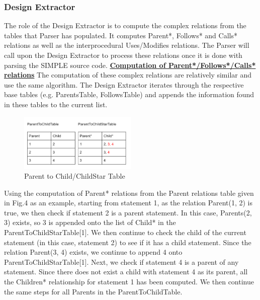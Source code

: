 \documentclass[12pt]{article}
\begin{document}
{{{{{{{{{{{{{{\begin{center}
\begin{minipage}{20em}
\end{minipage}
\end{center}
\normalsize



\subsubsection{Design Extractor}} 
The role of the Design Extractor is to compute the complex relations from the tables that Parser has populated. It computes Parent*, Follows* and Calls* relations as well as the interprocedural Uses/Modifies relations. The Parser will call upon the Design Extractor to process these relations once it is done with parsing the SIMPLE source code. \vspace{4mm}\newline
\textbf{\underline{Computation of Parent*/Follows*/Calls* relations}}\newline
The computation of these complex relations are relatively similar and use the same algorithm. The Design Extractor iterates through the respective base tables (e.g. ParentsTable, FollowsTable) and appends the information found in these tables to the current list.
\begin{figure}[htbp]
  \caption{Parent to Child/ChildStar Table}
  \centering  \includegraphics[width=0.5\textwidth]{ParentTable1.png}
\end{figure}
Using the computation of Parent* relations from the Parent relations table given in Fig.4 as an example, starting from statement 1, as the relation Parent(1, 2) is true, we then check if statement 2 is a parent statement. In this case, Parents(2, 3) exists, so 3 is appended onto the list of Child* in the ParentToChildStarTable[1]. We then continue to check the child of the current statement (in this case, statement 2) to see if it has a child statement. Since the relation Parent(3, 4) exists, we continue to append 4 onto ParentToChildStarTable[1]. Next, we check if statement 4 is a parent of any statement. Since there does not exist a child with statement 4 as its parent, all the Children* relationship for statement 1 has been computed. We then continue the same steps for all Parents in the ParentToChildTable. \newline
}}}}}}}}}}}}}
\end{document}
